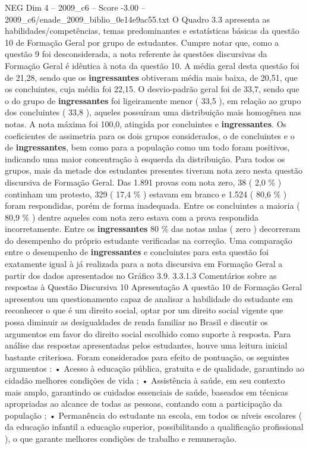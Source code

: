 \begin{textsample}{NEG Dim 4 – 2009\_c6 – Score -3.00 – 2009\_c6/enade\_2009\_biblio\_0e14e9ac55.txt}
O Quadro 3.3 apresenta as habilidades/competências, temas predominantes e estatísticas básicas da questão 10 de Formação Geral por grupo de estudantes.
Cumpre notar que, como a questão 9 foi desconsiderada, a nota referente às questões discursivas da Formação Geral é idêntica à nota da questão 10.
A média geral desta questão foi de 21,28, sendo que os \textbf{ingressantes} obtiveram média mais baixa, de 20,51, que os concluintes, cuja média foi 22,15.
O desvio-padrão geral foi de 33,7, sendo que o do grupo de \textbf{ingressantes} foi ligeiramente menor ( 33,5 ), em relação ao grupo dos concluintes ( 33,8 ), aqueles possuíram uma distribuição mais homogênea nas notas.
A nota máxima foi 100,0, atingida por concluintes e \textbf{ingressantes}.
Os coeficientes de assimetria para os dois grupos considerados, o de concluintes e o de \textbf{ingressantes}, bem como para a população como um todo foram positivos, indicando uma maior concentração à esquerda da distribuição.
Para todos os grupos, mais da metade dos estudantes presentes tiveram nota zero nesta questão discursiva de Formação Geral.
Das 1.891 provas com nota zero, 38 ( 2,0 \% ) continham um protesto, 329 ( 17,4 \% ) estavam em branco e 1.524 ( 80,6 \% ) foram respondidas, porém de forma inadequada.
Entre os concluintes a maioria ( 80,9 \% ) dentre aqueles com nota zero estava com a prova respondida incorretamente.
Entre os \textbf{ingressantes} 80 \% das notas nulas ( zero ) decorreram do desempenho do próprio estudante verificadas na correção.
Uma comparação entre o desempenho de \textbf{ingressantes} e concluintes para esta questão foi exatamente igual à já realizada para a nota discursiva em Formação Geral a partir dos dados apresentados no Gráfico 3.9. 3.3.1.3 Comentários sobre as respostas à Questão Discursiva 10 Apresentação A questão 10 de Formação Geral apresentou um questionamento capaz de analisar a habilidade do estudante em reconhecer o que é um direito social, optar por um direito social vigente que possa diminuir as desigualdades de renda familiar no Brasil e discutir os argumentos em favor do direito social escolhido como suporte à resposta.
Para análise das respostas apresentadas pelos estudantes, houve uma leitura inicial bastante criteriosa.
Foram considerados para efeito de pontuação, os seguintes argumentos : • Acesso à educação pública, gratuita e de qualidade, garantindo ao cidadão melhores condições de vida ; • Assistência à saúde, em seu contexto mais amplo, garantindo os cuidados essenciais de saúde, baseados em técnicas apropriadas ao alcance de todas as pessoas, contando com a participação da população ; • Permanência do estudante na escola, em todos os níveis escolares ( da educação infantil a educação superior, possibilitando a qualificação profissional ), o que garante melhores condições de trabalho e remuneração.

\end{textsample}
